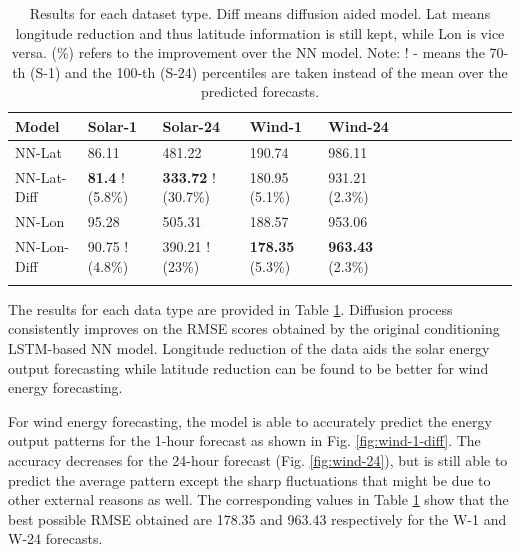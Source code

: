 \documentclass{article}
\begin{document}
\begin{table}[h]
  \centering
  \setlength{\tabcolsep}{10pt}
  \begin{tabular}{lllllllllllll}
    \toprule
    Model & Solar-1 & Solar-24 & Wind-1 & Wind-24\\
      \midrule
    NN-Lat & 86.11 & 481.22 &  190.74 & 986.11 \\
    NN-Lat-Diff & \textbf{81.4} ! (5.8\%) & \textbf{333.72} ! (30.7\%) & 180.95 (5.1\%) & 931.21 (2.3\%) \\
    NN-Lon & 95.28 & 505.31 &  188.57 & 953.06 \\
    NN-Lon-Diff & 90.75 ! (4.8\%) & 390.21 ! (23\%) & \textbf{178.35} (5.3\%) & \textbf{963.43} (2.3\%) \\
    \bottomrule
    \vspace*{0.2cm}
  \end{tabular}
  \caption{Results for each dataset type. Diff means diffusion aided model. Lat means longitude reduction and thus latitude information is still kept, while Lon is vice versa. (\%) refers to the improvement over the NN model. Note: ! - means the 70-th (S-1) and the 100-th (S-24) percentiles are taken instead of the mean over the predicted forecasts.}
  \label{tab:results}
\end{table}

The results for each data type are provided in Table \ref{tab:results}. Diffusion process consistently improves on the RMSE scores obtained by the original conditioning LSTM-based NN model. Longitude reduction of the data aids the solar energy output forecasting while latitude reduction can be found to be better for wind energy forecasting.

For wind energy forecasting, the model is able to accurately predict the energy output patterns for the 1-hour forecast as shown in Fig. \ref{fig:wind-1-diff}. The accuracy decreases for the 24-hour forecast (Fig. \ref{fig:wind-24}), but is still able to predict the average pattern except the sharp fluctuations that might be due to other external reasons as well. The corresponding values in Table \ref{tab:results} show that the best possible RMSE obtained are 178.35 and 963.43 respectively for the W-1 and W-24 forecasts.
\end{document}
